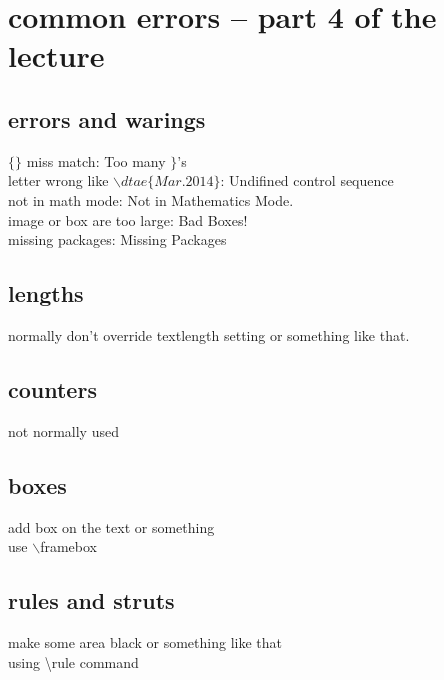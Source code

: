 \documentclass[11pt,a4paper]{article}
\begin{document}
\section{common errors -- part 4 of the lecture}{  


  \subsection{errors and warings}{
    $\{\}$ miss match: Too many $\}$'s \\
    letter wrong like $\backslash dtae\{Mar.2014\}$: Undifined control sequence\\
    not in math mode: Not in Mathematics Mode. \\
    image or box are too large: Bad Boxes! \\
    missing packages: Missing Packages
  }
  
  \subsection{lengths}{
    normally don't override textlength setting or something like that.
  }
  \subsection{counters}{not normally used}
  \subsection{boxes}{
    add box on the text or \framebox something \\
    use $\backslash$framebox
  }
  \subsection{rules and struts}{
    make some area black or something like that \\
    using \textbackslash{}rule command
  }
}
\end{document}

